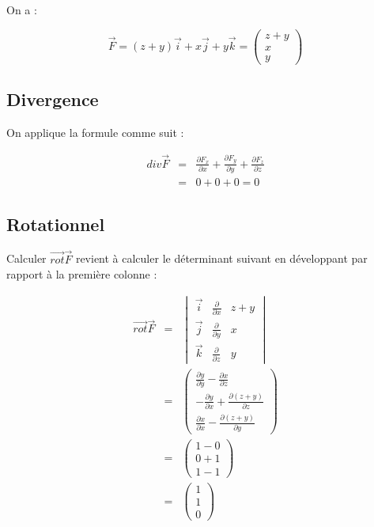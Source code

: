 \documentclass[a4paper, 11pt]{report} %
\newcommand{\vect}{\overrightarrow}
\begin{document}
On a :

\[
\vect{F} = (z+y)\vect{i} + x\vect{j} + y\vect{k} = \begin{pmatrix}z+y\\x\\y\end{pmatrix}
\]

\subsection{Divergence}

On applique la formule comme suit :

\begin{eqnarray*}
div\vect{F} & = & \frac{\partial F_x}{\partial x} + \frac{\partial F_y}{\partial y} + \frac{\partial F_z}{\partial z}\\
            & = & 0 + 0 + 0 = 0
\end{eqnarray*}

\subsection{Rotationnel}

Calculer $\vect{rot}\vect{F}$ revient à calculer le déterminant suivant en développant par rapport à la première colonne :

\begin{eqnarray*}
\vect{rot}\vect{F}  & = &   \begin{vmatrix}
                                \vect{i} & \frac{\partial}{\partial x} & z + y\\
                                \vect{j} & \frac{\partial}{\partial y} & x\\
                                \vect{k} & \frac{\partial}{\partial z} & y
                            \end{vmatrix}\\
                    & = &   \begin{pmatrix}
                                \frac{\partial y}{\partial y} - \frac{\partial x}{\partial z}\\
                                -\frac{\partial y}{\partial x} + \frac{\partial (z+y)}{\partial z}\\
                                \frac{\partial x}{\partial x} - \frac{\partial (z+y)}{\partial y}
                            \end{pmatrix}\\
                    & = &   \begin{pmatrix}
                        1 - 0\\
                        0 + 1\\
                        1 - 1
                    \end{pmatrix}\\
                    & = &   \begin{pmatrix}
                        1\\
                        1\\
                        0
                    \end{pmatrix}
\end{eqnarray*}
 
\end{document}
